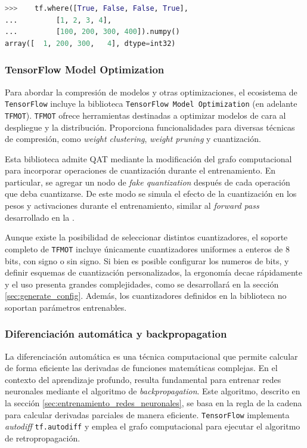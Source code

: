 \vspace{0.4cm}
\begin{lstlisting}[language=Python,label=code:tensorflow_where,caption=Ejemplo de uso de tf.where en TensorFlow.]
>>>    tf.where([True, False, False, True],
...         [1, 2, 3, 4],
...         [100, 200, 300, 400]).numpy()
array([  1, 200, 300,   4], dtype=int32)
\end{lstlisting}
\vspace{-0.4cm}

\subsubsection{TensorFlow Model Optimization}
\label{sec:tensorflow_model_optimization}
Para abordar la compresión de modelos y otras optimizaciones, el ecosistema de \texttt{TensorFlow} incluye la biblioteca \texttt{TensorFlow Model Optimization} (en adelante \texttt{TFMOT}). \texttt{TFMOT} ofrece herramientas destinadas a optimizar modelos de cara al despliegue y la distribución. Proporciona funcionalidades para diversas técnicas de compresión, como \textit{weight clustering}, \textit{weight pruning} y cuantización.

Esta biblioteca admite QAT mediante la modificación del grafo computacional para incorporar operaciones de cuantización durante el entrenamiento. En particular, se agregar un nodo de \textit{fake quantization} después de cada operación que deba cuantizarse. De este modo se simula el efecto de la cuantización en los pesos y activaciones durante el entrenamiento, similar al \textit{forward pass} desarrollado en la .

Aunque existe la posibilidad de seleccionar distintos cuantizadores, el soporte completo de \texttt{TFMOT} incluye únicamente cuantizadores uniformes a enteros de 8 bits, con signo o sin signo. Si bien es posible configurar los numeros de bits, y definir esquemas de cuantización personalizados, la ergonomía decae rápidamente y el uso presenta grandes complejidades, como se desarrollará en la sección \ref{sec:generate_config}. Además, los cuantizadores definidos en la biblioteca no soportan parámetros entrenables.

\subsubsection{Diferenciación automática y backpropagation}
\label{sec:autodiff}
La diferenciación automática es una técnica computacional que permite calcular de forma eficiente las derivadas de funciones matemáticas complejas. En el contexto del aprendizaje profundo, resulta fundamental para entrenar redes neuronales mediante el algoritmo de \textit{backpropagation}. Este algoritmo, descrito en la sección \ref{sec:entrenamiento_redes_neuronales}, se basa en la regla de la cadena para calcular derivadas parciales de manera eficiente. \texttt{TensorFlow} implementa \textit{autodiff} \texttt{tf.autodiff} y emplea el grafo computacional para ejecutar el algoritmo de retropropagación.

